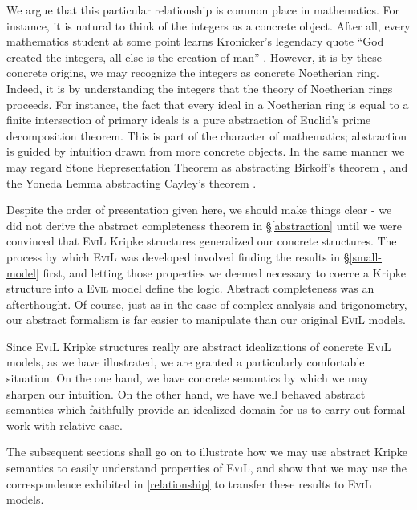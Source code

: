 We argue that this particular relationship is common place in
mathematics.  For instance, it is natural to think of the integers as
a concrete object.  After all, every mathematics student at some point
learns Kronicker's legendary quote ``God created the integers, all
else is the creation of man'' \cite[pg. 477]{bell_men_1986}.
However, it is by these concrete origins, we may recognize the
integers as concrete Noetherian ring.  Indeed, it is by understanding
the integers that the theory of Noetherian rings proceeds.  For
instance, the fact that every ideal in a Noetherian ring is equal to a finite
intersection of primary ideals is a pure abstraction of 
Euclid's prime decomposition theorem\cite[Lemmas 7.11 and 7.12,
pg. 83]{atiyah_introduction_1994}.  This is part of the character of
mathematics; abstraction is guided by intuition drawn from more
concrete objects.  In  the same manner we may regard Stone
Representation Theorem as abstracting
Birkoff's theorem \cite[chapters 11 and 5, respectively]{davey_introduction_2002}, and the Yoneda Lemma abstracting Cayley's
theorem \cite[chapters 4 and 1, respectively]{smith_post-modern_1999}.

Despite the order of presentation given here, we should make things
clear - we did not derive the abstract completeness theorem in
\S\ref{abstraction} until we were convinced that \textsc{EviL} Kripke
structures generalized our concrete structures.  The process by which
\textsc{EviL} was developed involved finding the results in
\S\ref{small-model} first, and letting those properties we deemed 
necessary to coerce a Kripke structure into a \textsc{Evil} 
model define the logic.  
Abstract completeness was an afterthought.  Of course, just as in the
case of complex analysis and trigonometry, our abstract formalism
is far easier to manipulate than our original \textsc{EviL} models.

Since \textsc{EviL} Kripke structures really are abstract
idealizations of concrete \textsc{EviL} models, as we have
illustrated, we are granted a particularly comfortable situation.  
On the one hand, we have concrete semantics by
which we may sharpen our intuition. On the other hand, we 
have well behaved abstract semantics which faithfully provide an 
idealized domain for us to carry out formal work with relative ease.

The subsequent sections shall go on to illustrate how we may use
abstract Kripke semantics to easily understand properties of
\textsc{EviL}, and show that we may use the correspondence exhibited
in \eqref{relationship} to transfer these results to \textsc{EviL} models.

